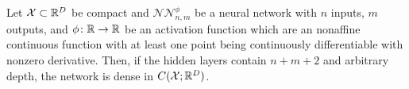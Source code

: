 \begin{theorem}\label{thm:uni_nn}
    Let \(\mathcal{X}\subset \mathbb{R}^D\) be compact and \(\mathcal{NN}^{\phi}_{n,m}\)
    be a neural network with \(n\) inputs, \(m\) outputs, and \(\phi\colon \mathbb{R} \rightarrow \mathbb{R}\) 
    be an activation function which are an nonaffine continuous function with at least one point
    being continuously differentiable with nonzero derivative. Then, if the hidden layers
    contain \(n+m+2\) and arbitrary depth, the network is dense in \(C(\mathcal{X}; \mathbb{R}^D)\).
\end{theorem}
